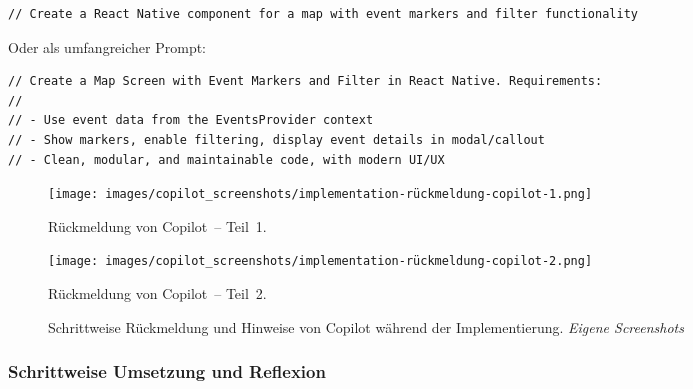 \begin{lstlisting}[language=HTML]
// Create a React Native component for a map with event markers and filter functionality
\end{lstlisting}

Oder als umfangreicher Prompt:
\begin{lstlisting}[language=HTML]
// Create a Map Screen with Event Markers and Filter in React Native. Requirements:
//
// - Use event data from the EventsProvider context
// - Show markers, enable filtering, display event details in modal/callout
// - Clean, modular, and maintainable code, with modern UI/UX
\end{lstlisting}


\begin{figure}[htbp]
      \centering
      \begin{minipage}{0.48\textwidth}
            \centering
            \texttt{[image: images/copilot\_screenshots/implementation-rückmeldung-copilot-1.png]}
            \caption{Rückmeldung von Copilot – Teil 1.}
            \label{fig:copilot-impl1}
      \end{minipage}
      \hfill
      \begin{minipage}{0.48\textwidth}
            \centering
            \texttt{[image: images/copilot\_screenshots/implementation-rückmeldung-copilot-2.png]}
            \caption{Rückmeldung von Copilot – Teil 2.}
            \label{fig:copilot-impl2}
      \end{minipage}
      \caption{Schrittweise Rückmeldung und Hinweise von Copilot während der Implementierung. \textit{Eigene Screenshots}}
      \label{fig:copilot-impl-pair}
\end{figure}

\subsubsection{Schrittweise Umsetzung und Reflexion}

